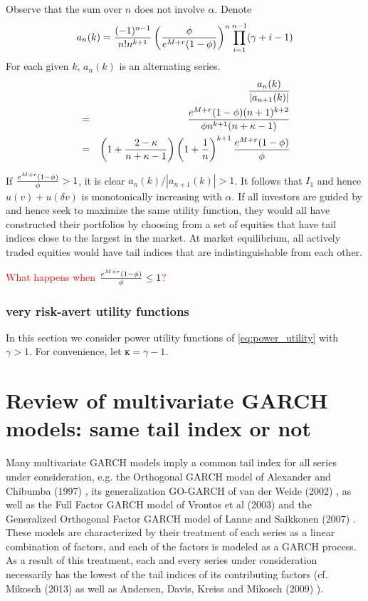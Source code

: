 \documentclass{article}
\begin{document}
Observe that the sum over $n$ does not involve $\alpha$. Denote
\[
a_n(k) =
{(-1)^{n-1} \over n! n^{k+1}}
\left(
     {\phi \over e^{M + r} (1 - \phi)}
     \right)^n
     \prod_{i=1}^{n-1} (\gamma + i - 1)
\]
For each given $k$, $a_n(k)$ is an alternating series.
\begin{eqnarray*}
  && {a_n(k) \over |a_{n+1}(k)|} \\
  &=& {
    e^{M + r} (1 - \phi) (n+1)^{k+2}
    \over
    \phi n^{k+1} (n + \kappa - 1)
  } \\
  &=&
  \left(1 + {2 - \kappa \over n + \kappa - 1}\right)
  \left( 1 + {1 \over n} \right)^{k+1}
  {e^{M + r} (1 - \phi) \over \phi}
\end{eqnarray*}

If ${e^{M + r} (1 - \phi) \over \phi} > 1$, it is clear
$a_n(k)/|a_{n+1}(k)| > 1$. It follows that $I_1$ and hence $u(v) +
u(\delta v)$ is monotonically increasing with $\alpha$. If all
investors are guided by and hence seek to maximize the same utility
function, they would all 
have constructed their portfolios by choosing from a set of equities
that have tail indices close to the largest in the market. At market
equilibrium, all actively traded equities would have tail indices that
are indistinguishable from each other.

\textcolor{red}{
  What happens when ${e^{M + r} (1 - \phi) \over \phi} \leq 1$?
}

\subsubsection{very risk-avert utility functions}
In this section we consider power utility functions of
\eqref{eq:power_utility} with $\gamma > 1$. For convenience, let $ĸ =
\gamma - 1$.

\section{Review of multivariate GARCH models: same tail index or not}
Many multivariate GARCH models imply a common tail index for all
series under consideration, e.g. the Orthogonal GARCH model of
Alexander and Chibumba (1997) \cite{alexander1997multivariate}, its
generalization GO-GARCH of van der Weide (2002) \cite{van2002go}, as
well as the Full Factor GARCH model of Vrontos et al (2003)
\cite{vrontos2003full} and the Generalized Orthogonal Factor GARCH
model of Lanne and Saikkonen (2007) \cite{lanne2007modeling}. These
models are characterized by their treatment of each series as a linear
combination of factors, and each of the factors is modeled as a GARCH
process. As a result of this treatment, each and every series under
consideration necessarily has the lowest of the tail indices of its
contributing factors (cf. Mikosch (2013) \cite{Mikosch2013} as well
as Andersen, Davis, Kreiss and Mikosch (2009)
\cite{andersen2009handbook}).
\end{document}
